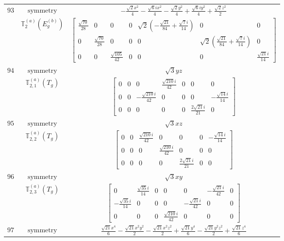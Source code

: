 \documentclass[fleqn,8pt,landscape]{jsarticle}
\begin{document}
\begin{longtable}{ccc}
$ 93 $ & $ \text{symmetry} $ & $ - \frac{\sqrt{2} x^{2}}{4} - \frac{\sqrt{6} i x^{2}}{4} - \frac{\sqrt{2} y^{2}}{4} + \frac{\sqrt{6} i y^{2}}{4} + \frac{\sqrt{2} z^{2}}{2} $ \\
$  $ & $ \mathbb{T}_{2}^{(a)}(E_{g}^{(b)}) $ & $ \begin{bmatrix} \frac{\sqrt{70}}{28} & 0 & 0 & 0 & \sqrt{2} \left(- \frac{\sqrt{21}}{84} + \frac{\sqrt{7} i}{14}\right) & 0 & 0 \\ 0 & \frac{\sqrt{70}}{28} & 0 & 0 & 0 & \sqrt{2} \left(\frac{\sqrt{21}}{84} + \frac{\sqrt{7} i}{14}\right) & 0 \\ 0 & 0 & \frac{\sqrt{105}}{42} & 0 & 0 & 0 & \frac{\sqrt{21} i}{14} \end{bmatrix} $ \\ \hline
$ 94 $ & $ \text{symmetry} $ & $ \sqrt{3} y z $ \\
$  $ & $ \mathbb{T}_{2,1}^{(a)}(T_{g}) $ & $ \begin{bmatrix} 0 & 0 & 0 & \frac{\sqrt{210} i}{42} & 0 & 0 & 0 \\ 0 & 0 & - \frac{\sqrt{210} i}{42} & 0 & 0 & 0 & - \frac{\sqrt{14} i}{14} \\ 0 & 0 & 0 & 0 & 0 & \frac{2 \sqrt{21} i}{21} & 0 \end{bmatrix} $ \\ \hline
$ 95 $ & $ \text{symmetry} $ & $ \sqrt{3} x z $ \\
$  $ & $ \mathbb{T}_{2,2}^{(a)}(T_{g}) $ & $ \begin{bmatrix} 0 & 0 & \frac{\sqrt{210} i}{42} & 0 & 0 & 0 & - \frac{\sqrt{14} i}{14} \\ 0 & 0 & 0 & \frac{\sqrt{210} i}{42} & 0 & 0 & 0 \\ 0 & 0 & 0 & 0 & \frac{2 \sqrt{21} i}{21} & 0 & 0 \end{bmatrix} $ \\ \hline
$ 96 $ & $ \text{symmetry} $ & $ \sqrt{3} x y $ \\
$  $ & $ \mathbb{T}_{2,3}^{(a)}(T_{g}) $ & $ \begin{bmatrix} 0 & \frac{\sqrt{35} i}{14} & 0 & 0 & 0 & - \frac{\sqrt{21} i}{42} & 0 \\ - \frac{\sqrt{35} i}{14} & 0 & 0 & 0 & - \frac{\sqrt{21} i}{42} & 0 & 0 \\ 0 & 0 & 0 & \frac{\sqrt{210} i}{42} & 0 & 0 & 0 \end{bmatrix} $ \\ \hline
$ 97 $ & $ \text{symmetry} $ & $ \frac{\sqrt{21} x^{4}}{6} - \frac{\sqrt{21} x^{2} y^{2}}{2} - \frac{\sqrt{21} x^{2} z^{2}}{2} + \frac{\sqrt{21} y^{4}}{6} - \frac{\sqrt{21} y^{2} z^{2}}{2} + \frac{\sqrt{21} z^{4}}{6} $ \\

\end{longtable}
\end{document}
